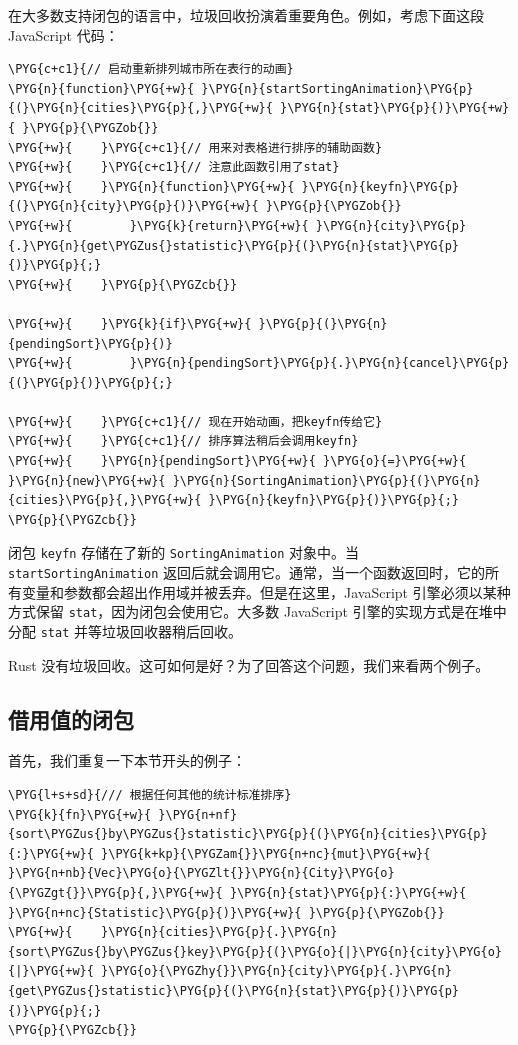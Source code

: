 在大多数支持闭包的语言中，垃圾回收扮演着重要角色。例如，考虑下面这段 JavaScript 代码：

\begin{Verbatim}[commandchars=\\\{\},breaklines=true,breakanywhere=true,fontsize=\codefont,xleftmargin=17bp]
\PYG{c+c1}{// 启动重新排列城市所在表行的动画}
\PYG{n}{function}\PYG{+w}{ }\PYG{n}{startSortingAnimation}\PYG{p}{(}\PYG{n}{cities}\PYG{p}{,}\PYG{+w}{ }\PYG{n}{stat}\PYG{p}{)}\PYG{+w}{ }\PYG{p}{\PYGZob{}}
\PYG{+w}{    }\PYG{c+c1}{// 用来对表格进行排序的辅助函数}
\PYG{+w}{    }\PYG{c+c1}{// 注意此函数引用了stat}
\PYG{+w}{    }\PYG{n}{function}\PYG{+w}{ }\PYG{n}{keyfn}\PYG{p}{(}\PYG{n}{city}\PYG{p}{)}\PYG{+w}{ }\PYG{p}{\PYGZob{}}
\PYG{+w}{        }\PYG{k}{return}\PYG{+w}{ }\PYG{n}{city}\PYG{p}{.}\PYG{n}{get\PYGZus{}statistic}\PYG{p}{(}\PYG{n}{stat}\PYG{p}{)}\PYG{p}{;}
\PYG{+w}{    }\PYG{p}{\PYGZcb{}}

\PYG{+w}{    }\PYG{k}{if}\PYG{+w}{ }\PYG{p}{(}\PYG{n}{pendingSort}\PYG{p}{)}
\PYG{+w}{        }\PYG{n}{pendingSort}\PYG{p}{.}\PYG{n}{cancel}\PYG{p}{(}\PYG{p}{)}\PYG{p}{;}

\PYG{+w}{    }\PYG{c+c1}{// 现在开始动画，把keyfn传给它}
\PYG{+w}{    }\PYG{c+c1}{// 排序算法稍后会调用keyfn}
\PYG{+w}{    }\PYG{n}{pendingSort}\PYG{+w}{ }\PYG{o}{=}\PYG{+w}{ }\PYG{n}{new}\PYG{+w}{ }\PYG{n}{SortingAnimation}\PYG{p}{(}\PYG{n}{cities}\PYG{p}{,}\PYG{+w}{ }\PYG{n}{keyfn}\PYG{p}{)}\PYG{p}{;}
\PYG{p}{\PYGZcb{}}
\end{Verbatim}

闭包 \texttt{keyfn} 存储在了新的 \texttt{SortingAnimation} 对象中。当 \texttt{startSortingAnimation} 返回后就会调用它。通常，当一个函数返回时，它的所有变量和参数都会超出作用域并被丢弃。但是在这里，JavaScript 引擎必须以某种方式保留 \texttt{stat}，因为闭包会使用它。大多数 JavaScript 引擎的实现方式是在堆中分配 \texttt{stat} 并等垃圾回收器稍后回收。

Rust 没有垃圾回收。这可如何是好？为了回答这个问题，我们来看两个例子。

\subsection{借用值的闭包}

首先，我们重复一下本节开头的例子：

\begin{Verbatim}[commandchars=\\\{\},breaklines=true,breakanywhere=true,fontsize=\codefont,xleftmargin=17bp]
\PYG{l+s+sd}{/// 根据任何其他的统计标准排序}
\PYG{k}{fn}\PYG{+w}{ }\PYG{n+nf}{sort\PYGZus{}by\PYGZus{}statistic}\PYG{p}{(}\PYG{n}{cities}\PYG{p}{:}\PYG{+w}{ }\PYG{k+kp}{\PYGZam{}}\PYG{n+nc}{mut}\PYG{+w}{ }\PYG{n+nb}{Vec}\PYG{o}{\PYGZlt{}}\PYG{n}{City}\PYG{o}{\PYGZgt{}}\PYG{p}{,}\PYG{+w}{ }\PYG{n}{stat}\PYG{p}{:}\PYG{+w}{ }\PYG{n+nc}{Statistic}\PYG{p}{)}\PYG{+w}{ }\PYG{p}{\PYGZob{}}
\PYG{+w}{    }\PYG{n}{cities}\PYG{p}{.}\PYG{n}{sort\PYGZus{}by\PYGZus{}key}\PYG{p}{(}\PYG{o}{|}\PYG{n}{city}\PYG{o}{|}\PYG{+w}{ }\PYG{o}{\PYGZhy{}}\PYG{n}{city}\PYG{p}{.}\PYG{n}{get\PYGZus{}statistic}\PYG{p}{(}\PYG{n}{stat}\PYG{p}{)}\PYG{p}{)}\PYG{p}{;}
\PYG{p}{\PYGZcb{}}
\end{Verbatim}

